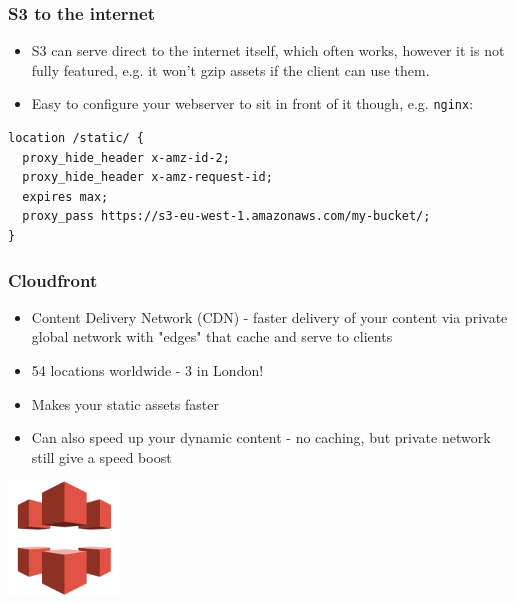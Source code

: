 \documentclass{beamer}
\begin{document}
\begin{frame}[fragile]\frametitle{S3 to the internet}

    \begin{itemize}
        \item S3 can serve direct to the internet itself, which often works, however it is not fully featured, e.g. it won't gzip assets if the client can use them.
        \item Easy to configure your webserver to sit in front of it though, e.g. \texttt{nginx}:
    \end{itemize}

    \begin{lstlisting}[basicstyle=\scriptsize]
location /static/ {
  proxy_hide_header x-amz-id-2;
  proxy_hide_header x-amz-request-id;
  expires max;
  proxy_pass https://s3-eu-west-1.amazonaws.com/my-bucket/;
}
    \end{lstlisting}

\end{frame}


\begin{frame}[fragile]\frametitle{Cloudfront}

    \begin{itemize}
        \item Content Delivery Network (CDN) - faster delivery of your content via private global network with "edges" that cache and serve to clients
        \item 54 locations worldwide - 3 in London!
        \item Makes your static assets faster
        \item Can also speed up your dynamic content - no caching, but private network still give a speed boost
    \end{itemize}

    \begin{center}
        \includegraphics[width=3cm]{aws-cloudfront}
    \end{center}

\end{frame}
\end{document}
